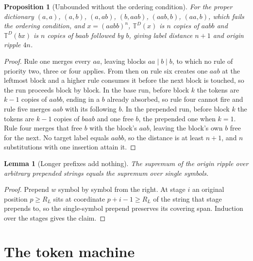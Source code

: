 \documentclass[11pt,a4paper]{article}
\theoremstyle{definition}
\theoremstyle{plain}
\newtheorem{lemma}{Lemma}
\newtheorem{proposition}{Proposition}
\newcommand{\T}{\mathbb{T}}
\newcommand{\ripple}{R_{L}}
\begin{document}
\begin{proposition}[Unbounded without the ordering condition]\label{prop:sixrule}
For the proper dictionary \((a,a)\), \((a,b)\), \((a,ab)\), \((b,aab)\), \((aab,b)\), \((aa,b)\), which fails the
ordering condition, and \(x = (aabb)^n\), \(\T^D(x)\) is \(n\) copies of \(aabb\) and \(\T^D(bx)\) is \(n\) copies of
\(baab\) followed by \(b\), giving label distance \(n + 1\) and origin ripple \(4n\).
\end{proposition}

\begin{proof}
Rule one merges every \(aa\), leaving blocks \(aa \mid b \mid b\), to which no rule of priority two, three or four
applies. From then on rule six creates one \(aab\) at the leftmost block and a higher rule consumes it before the next
block is touched, so the run proceeds block by block. In the base run, before block \(k\) the tokens are \(k - 1\)
copies of \(aabb\), ending in a \(b\) already absorbed, so rule four cannot fire and rule five merges \(aab\) with its
following \(b\). In the prepended run, before block \(k\) the tokens are \(k - 1\) copies of \(baab\) and one free
\(b\), the prepended one when \(k = 1\). Rule four merges that free \(b\) with the block's \(aab\), leaving the block's
own \(b\) free for the next. No target label equals \(aabb\), so the distance is at least \(n + 1\), and \(n\)
substitutions with one insertion attain it.
\end{proof}


\begin{lemma}[Longer prefixes add nothing]\label{lem:D}
The supremum of the origin ripple over arbitrary prepended strings equals the supremum over single symbols.
\end{lemma}

\begin{proof}
Prepend \(w\) symbol by symbol from the right. At stage \(i\) an original position \(p \ge \ripple\) sits at coordinate
\(p + i - 1 \ge \ripple\) of the string that stage prepends to, so the single-symbol prepend preserves its covering
span. Induction over the stages gives the claim.
\end{proof}

\section{The token machine}\label{sec:machine}
\end{document}
